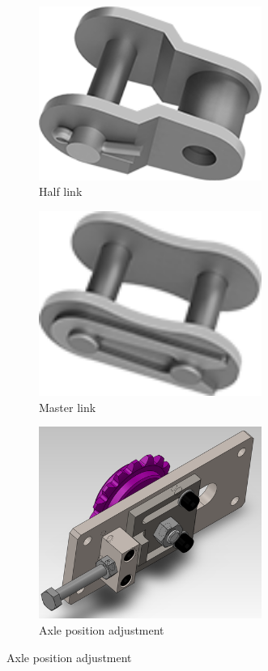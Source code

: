 \documentclass[10pt,letterpaper]{book}
\begin{document}
\begin{figure}[H]
	\begin{subfigure}[b]{.32\linewidth}
		\includegraphics[width=0.8\textwidth]{imgs/chain_halflink.png}
		\caption{Half link}
	\end{subfigure}\begin{subfigure}[b]{.32\linewidth}
		\includegraphics[width=0.8\textwidth]{imgs/chain_masterlink.png}
		\caption{Master link}
	\end{subfigure}\begin{subfigure}[b]{.32\linewidth}
		\includegraphics[width=0.8\textwidth]{imgs/chain_axletens.png}
		\caption{Axle position adjustment}
	\end{subfigure}
	

\end{figure}
\end{document}
